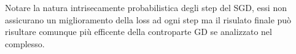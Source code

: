\documentclass[12pt,a4paper,openright,twoside]{report}
\renewcommand{\chaptermark}[1]{\markboth{\thechapter.\ #1}{}}
\begin{document}
Notare la natura intrisecamente probabilistica degli step del SGD, essi non assicurano un miglioramento della loss ad ogni step ma il risulato finale può risultare comunque più efficente della controparte GD se analizzato nel complesso.



\end{document}
